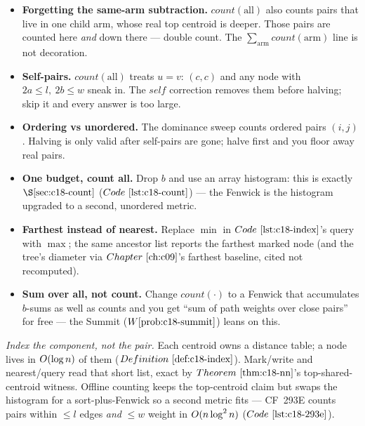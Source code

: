 \begin{warningbox}
\begin{itemize}[nosep]
  \item \textbf{Forgetting the same-arm subtraction.} \(\mathit{count}(\text{all})\) also
        counts pairs that live in one child arm, whose real top centroid is deeper. Those
        pairs are counted here \emph{and} down there --- double count. The
        \(\sum_{\text{arm}}\mathit{count}(\text{arm})\) line is not decoration.
  \item \textbf{Self-pairs.} \(\mathit{count}(\text{all})\) treats \(u=v\): \((c,c)\) and
        any node with \(2a\le l,\ 2b\le w\) sneak in. The \(\mathit{self}\) correction
        removes them before halving; skip it and every answer is too large.
  \item \textbf{Ordering vs unordered.} The dominance sweep counts ordered pairs
        \((i,j)\). Halving is only valid after self-pairs are gone; halve first and you
        floor away real pairs.
\end{itemize}
\end{warningbox}

\begin{hardeningbox}
\begin{itemize}[nosep]
  \item \textbf{One budget, count all.} Drop \(b\) and use an array histogram: this is
        exactly \(\secref{c18-count}\) (\(\coderef{c18-count}\)) --- the Fenwick is the
        histogram upgraded to a second, unordered metric.
  \item \textbf{Farthest instead of nearest.} Replace \(\min\) in \(\coderef{c18-index}\)'s
        query with \(\max\); the same ancestor list reports the farthest marked node (and
        the tree's diameter via \(\chref{c09}\)'s farthest baseline, cited not recomputed).
  \item \textbf{Sum over all, not count.} Change \(\mathit{count}(\cdot)\) to a Fenwick
        that accumulates \(b\)-sums as well as counts and you get ``sum of path weights
        over close pairs'' for free --- the Summit (\(\probref{c18-summit}\)) leans on this.
\end{itemize}
\end{hardeningbox}

\begin{recallbox}
\emph{Index the component, not the pair.} Each centroid owns a distance table; a node
lives in \(O(\log n)\) of them (\(\defref{c18-index}\)). Mark/write and
nearest/query read that short list, exact by \(\thmref{c18-nn}\)'s top-shared-centroid
witness. Offline counting keeps the top-centroid claim but swaps the histogram for a
sort-plus-Fenwick so a second metric fits --- CF~293E counts pairs within \(\le l\) edges
\emph{and} \(\le w\) weight in \(O(n\log^2 n)\) (\(\coderef{c18-293e}\)).
\end{recallbox}
